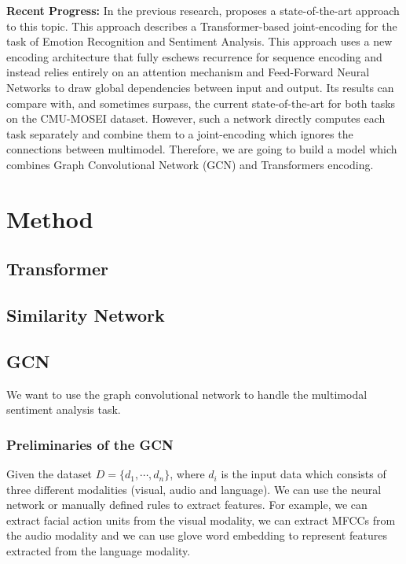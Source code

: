 \documentclass[11pt]{article}
\begin{document}
\noindent \textbf{Recent Progress:}
In the previous research, \cite{DBLP:journals/corr/abs-2006-15955} proposes a state-of-the-art approach to this topic. This approach describes a Transformer-based\cite{DBLP:journals/corr/VaswaniSPUJGKP17} joint-encoding for the task of Emotion Recognition and Sentiment Analysis. 
This approach uses a new encoding architecture that fully eschews recurrence for sequence encoding and instead relies entirely on an attention mechanism and Feed-Forward Neural Networks to draw global dependencies between input and output. Its results can compare with, and sometimes surpass, the current state-of-the-art for both tasks on the CMU-MOSEI dataset.
However, such a network directly computes each task separately and combine them to a joint-encoding which ignores the connections between multimodel.
Therefore, we are going to build a model which combines Graph Convolutional Network (GCN) \cite{DBLP:journals/corr/KipfW16} and Transformers encoding.

\section{Method}
\subsection{Transformer}

\subsection{Similarity Network}

\subsection{GCN}

We want to use the graph convolutional network to handle the multimodal sentiment analysis task.

\subsubsection{Preliminaries of the GCN}

Given the dataset $D = \{d_1,\cdots,d_n \}$, where $d_i$ is the input data which consists of three different modalities (visual, audio and language). We can use the neural network or manually defined rules to extract features. For example, we can extract facial action units from the visual modality, we can extract MFCCs from the audio modality and we can use glove word embedding to represent features extracted from the language modality.
\end{document}
